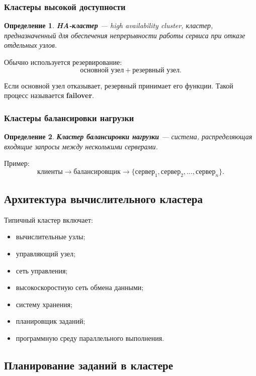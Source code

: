 \documentclass[12pt,a4paper]{article}
\newtheorem{definition}{Определение}
\begin{document}
\subsubsection{Кластеры высокой доступности}

\begin{definition}
\textbf{HA-кластер} --- high availability cluster, кластер, предназначенный для обеспечения непрерывности работы сервиса при отказе отдельных узлов.
\end{definition}

Обычно используется резервирование:
\[
\text{основной узел} + \text{резервный узел}.
\]

Если основной узел отказывает, резервный принимает его функции. Такой процесс называется \textbf{failover}.

\subsubsection{Кластеры балансировки нагрузки}

\begin{definition}
\textbf{Кластер балансировки нагрузки} --- система, распределяющая входящие запросы между несколькими серверами.
\end{definition}

Пример:
\[
\text{клиенты}
\rightarrow
\text{балансировщик}
\rightarrow
\{\text{сервер}_1,\text{сервер}_2,\ldots,\text{сервер}_n\}.
\]

\subsection{Архитектура вычислительного кластера}

Типичный кластер включает:
\begin{itemize}
    \item вычислительные узлы;
    \item управляющий узел;
    \item сеть управления;
    \item высокоскоростную сеть обмена данными;
    \item систему хранения;
    \item планировщик заданий;
    \item программную среду параллельного выполнения.
\end{itemize}

\subsection{Планирование заданий в кластере}
\end{document}
